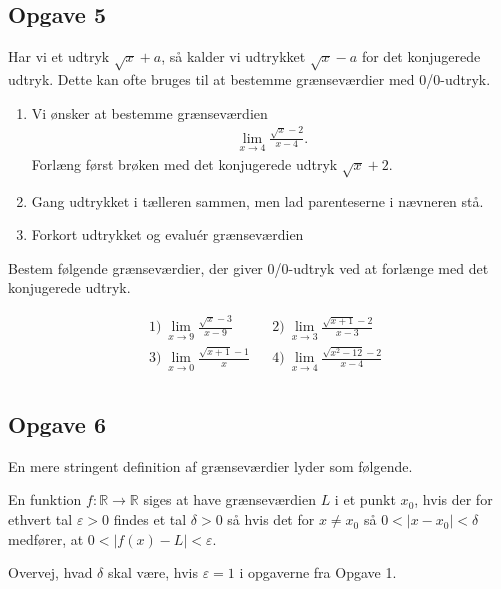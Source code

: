 \subsection*{Opgave 5}
Har vi et udtryk $\sqrt{x} + a$, så kalder vi udtrykket $\sqrt{x} - a$ for det konjugerede udtryk. Dette kan ofte bruges til at bestemme grænseværdier med 0/0-udtryk. 
\begin{enumerate}[label=\roman*)]
	\item Vi ønsker at bestemme grænseværdien
	\begin{align*}
		\lim_{x \to 4} \frac{\sqrt{x}-2}{x-4}.
	\end{align*}
	Forlæng først brøken med det konjugerede udtryk $\sqrt{x}+2$. 
	\item Gang udtrykket i tælleren sammen, men lad parenteserne i nævneren stå.
	\item Forkort udtrykket og evaluér grænseværdien
\end{enumerate}

Bestem følgende grænseværdier, der giver 0/0-udtryk ved at forlænge med det konjugerede udtryk. 

\begin{align*}
	&1) \ \lim_{x \to 9} \frac{\sqrt{x}-3}{x-9}    & &2) \ \lim_{x\to 3}\frac{\sqrt{x+1} - 2}{x-3}  \\
	&3) \ \lim_{x \to 0} \frac{\sqrt{x + 1} - 1}{x}  & &4) \ \lim_{x \to 4} \frac{\sqrt{x^2 -12}-2}{x-4}  \\
\end{align*}

\subsection*{Opgave 6}
En mere stringent definition af grænseværdier lyder som følgende.
\begin{defn}[Grænseværdi]
	En funktion $f: \mathbb{R} \to \mathbb{R}$ siges at have grænseværdien $L$ i et punkt
	$x_0$, hvis der for ethvert tal $\varepsilon > 0$ findes et tal $\delta > 0$ så
	 hvis det for $x \neq x_0$ så $0 < |x - x_0| < \delta$ medfører, at $0 < |f(x) - L| < \varepsilon$.
\end{defn}
Overvej, hvad $\delta$ skal være, hvis $\varepsilon = 1$ i opgaverne fra Opgave 1. 
